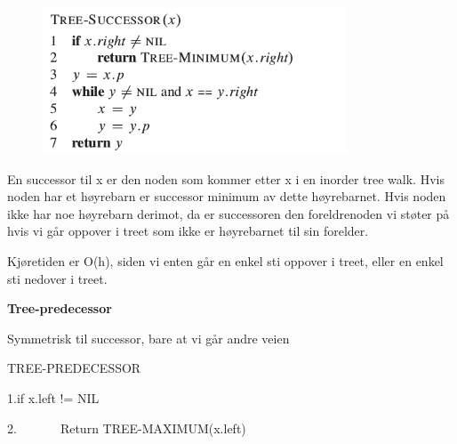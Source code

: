 \documentclass[12pt]{report}
\begin{document}
\vspace{\baselineskip}



\begin{figure}[H]
	\begin{Center}
		\includegraphics[width=3.57in,height=1.72in]{./media/image82.png}
	\end{Center}
\end{figure}



\par

 \par

En successor til x er den noden som kommer etter x i en inorder tree walk. Hvis noden har et høyrebarn er successor minimum av dette høyrebarnet. Hvis noden ikke har noe høyrebarn derimot, da er successoren den foreldrenoden vi støter på hvis vi går oppover i treet som ikke er høyrebarnet til sin forelder. \par


\vspace{\baselineskip}
Kjøretiden er O(h), siden vi enten går en enkel sti oppover i treet, eller en enkel sti nedover i treet. \par


\vspace{\baselineskip}
{\fontsize{14pt}{16.8pt}\selectfont \textbf{Tree-predecessor}\par}\par

Symmetrisk til successor, bare at vi går andre veien\par

TREE-PREDECESSOR\par

1.\tab if x.left != NIL\par

2.\tab \ \ \ \ \ \ \  Return TREE-MAXIMUM(x.left)\par
\end{document}
